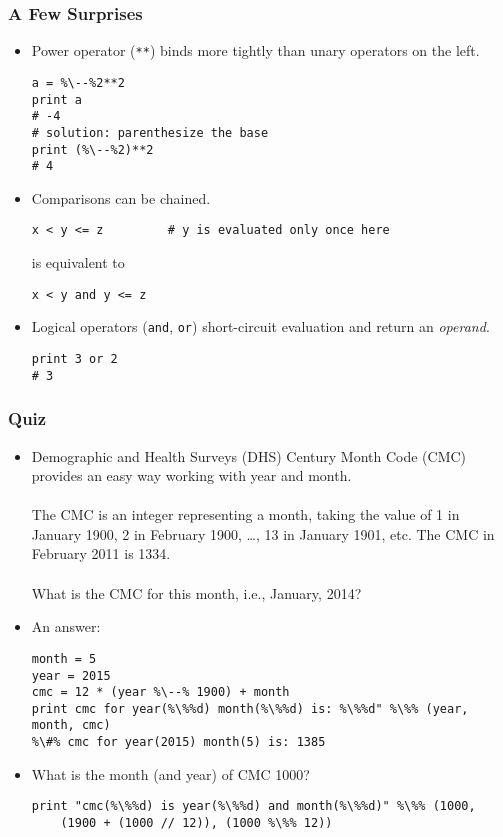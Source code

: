 \documentclass{beamer}
\begin{document}
\begin{frame}[fragile]
\frametitle{A Few Surprises}
\begin{itemize}
\item Power operator (\lstinline{**}) binds more tightly
      than unary operators on the left.
\begin{lstlisting}[escapechar=\%]
a = %\--%2**2
print a
# -4
# solution: parenthesize the base
print (%\--%2)**2
# 4 
\end{lstlisting}
\item Comparisons can be chained. 
\begin{lstlisting}
x < y <= z         # y is evaluated only once here
\end{lstlisting}
is equivalent to
\begin{lstlisting}
x < y and y <= z
\end{lstlisting}
\item Logical operators (\lstinline{and}, \lstinline{or})
      short-circuit evaluation and return 
      an \emph{operand}.
\begin{lstlisting}
print 3 or 2
# 3
\end{lstlisting}
\end{itemize}
\end{frame}

\begin{frame}[fragile]
\frametitle{Quiz}
\begin{itemize}
\item Demographic and Health Surveys (DHS) Century
Month Code (CMC)\cite[p.5]{MEASUREDHSPlus} provides an easy way
working with year and month.
\\~\\
The CMC is
an integer representing a month, taking
the value of 1 in January 1900, 2 in
February 1900, \ldots, 13 in January 1901, etc.
The CMC in February 2011 is 1334.
\\~\\
What is the CMC for this month, i.e., January, 2014?
\item<2-> An answer:
\begin{lstlisting}[escapechar=\%]
month = 5
year = 2015
cmc = 12 * (year %\--% 1900) + month
print cmc for year(%\%%d) month(%\%%d) is: %\%%d" %\%% (year, month, cmc)
%\#% cmc for year(2015) month(5) is: 1385
\end{lstlisting}
\item<3-> What is the month (and year) of CMC 1000? 
\begin{lstlisting}[escapechar=\%]
print "cmc(%\%%d) is year(%\%%d) and month(%\%%d)" %\%% (1000,
    (1900 + (1000 // 12)), (1000 %\%% 12))
\end{lstlisting}
\end{itemize}
\end{frame}
\end{document}

